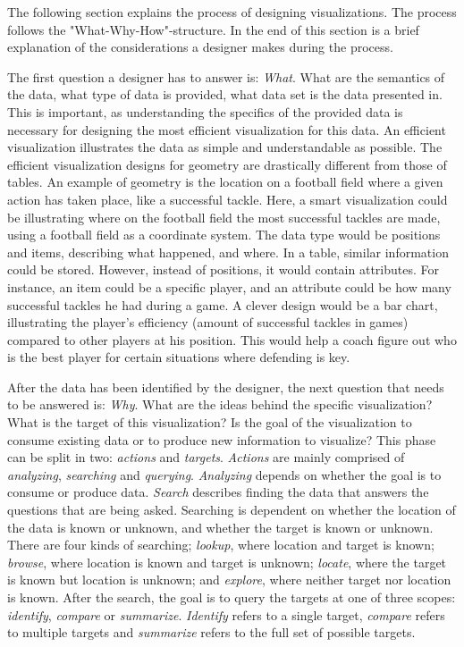 \documentclass[Report.tex]{subfiles}
\begin{document}
The following section explains the process of designing visualizations. The process follows the "What-Why-How"-structure. In the end of this section is a brief explanation of the considerations a designer makes during the process.

The first question a designer has to answer is: \emph{What}. What are the semantics of the data, what type of data is provided, what data set is the data presented in. This is important, as understanding the specifics of the provided data is necessary for designing the most efficient visualization for this data. An efficient visualization illustrates the data as simple and understandable as possible. The efficient visualization designs for geometry are drastically different from those of tables. An example of geometry is the location on a football field where a given action has taken place, like a successful tackle. Here, a smart visualization could be illustrating where on the football field the most successful tackles are made, using a football field as a coordinate system. The data type would be positions and items, describing what happened, and where. In a table, similar information could be stored. However, instead of positions, it would contain attributes. For instance, an item could be a specific player, and an attribute could be how many successful tackles he had during a game. A clever design would be a bar chart, illustrating the player’s efficiency (amount of successful tackles in games) compared to other players at his position. This would help a coach figure out who is the best player for certain situations where defending is key.

After the data has been identified by the designer, the next question that needs to be answered is: \emph{Why}. What are the ideas behind the specific visualization? What is the target of this visualization? Is the goal of the visualization to consume existing data or to produce new information to visualize? This phase can be split in two: \emph{actions} and \emph{targets}. \emph{Actions} are mainly comprised of \emph{analyzing}, \emph{searching} and \emph{querying}. \emph{Analyzing} depends on whether the goal is to consume or produce data. \emph{Search} describes finding the data that answers the questions that are being asked. Searching is dependent on whether the location of the data is known or unknown, and whether the target is known or unknown. There are four kinds of searching; \emph{lookup}, where location and target is known; \emph{browse}, where location is known and target is unknown; \emph{locate}, where the target is known but location is unknown; and \emph{explore}, where neither target nor location is known. After the search, the goal is to query the targets at one of three scopes: \emph{identify}, \emph{compare} or \emph{summarize}. \emph{Identify} refers to a single target, \emph{compare} refers to multiple targets and \emph{summarize} refers to the full set of possible targets.
\end{document}
